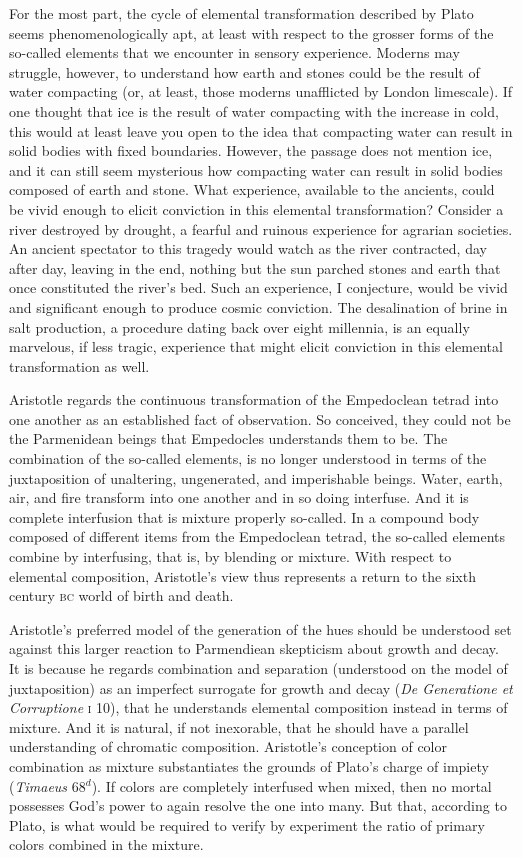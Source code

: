 For the most part, the cycle of elemental transformation described by Plato seems phenomenologically apt, at least with respect to the grosser forms of the so-called elements that we encounter in sensory experience. Moderns may struggle, however, to understand how earth and stones could be the result of water compacting (or, at least, those moderns unafflicted by London limescale). If one thought that ice is the result of water compacting with the increase in cold, this would at least leave you open to the idea that compacting water can result in solid bodies with fixed boundaries. However, the passage does not mention ice, and it can still seem mysterious how compacting water can result in solid bodies composed of earth and stone. What experience, available to the ancients, could be vivid enough to elicit conviction in this elemental transformation? Consider a river destroyed by drought, a fearful and ruinous experience for agrarian societies. An ancient spectator to this tragedy would watch as the river contracted, day after day, leaving in the end, nothing but the sun parched stones and earth that once constituted the river's bed. Such an experience, I conjecture, would be vivid and significant enough to produce cosmic conviction. The desalination of brine in salt production, a procedure dating back over eight millennia, is an equally marvelous, if less tragic, experience that might elicit conviction in this elemental transformation as well.

Aristotle regards the continuous transformation of the Empedoclean tetrad into one another as an established fact of observation. So conceived, they could not be the Parmenidean beings that Empedocles understands them to be. The combination of the so-called elements, is no longer understood in terms of the juxtaposition of unaltering, ungenerated, and imperishable beings. Water, earth, air, and fire transform into one another and in so doing interfuse. And it is complete interfusion that is mixture properly so-called. In a compound body composed of different items from the Empedoclean tetrad, the so-called elements combine by interfusing, that is, by blending or mixture. With respect to elemental composition, Aristotle's view thus represents a return to the sixth century \textsc{bc} world of birth and death.

Aristotle's preferred model of the generation of the hues should be understood set against this larger reaction to Parmendiean skepticism about growth and decay. It is because he regards combination and separation (understood on the model of juxtaposition) as an imperfect surrogate for growth and decay (\emph{De Generatione et Corruptione} \textsc{i} 10), that he understands elemental composition instead in terms of mixture. And it is natural, if not inexorable, that he should have a parallel understanding of chromatic composition. Aristotle's conception of color combination as mixture substantiates the grounds of Plato's charge of impiety (\emph{Timaeus} 68\( ^{d} \)). If colors are completely interfused when mixed, then no mortal possesses God's power to again resolve the one into many. But that, according to Plato, is what would be required to verify by experiment the ratio of primary colors combined in the mixture.

